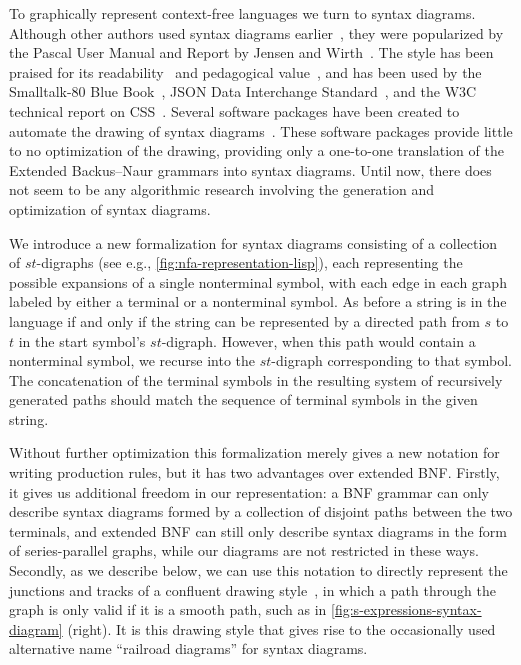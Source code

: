 \documentclass[10pt]{llncs}
\begin{document}
To graphically represent context-free languages we turn to syntax diagrams.
Although other authors used syntax diagrams earlier~\cite{cande-book}, they were popularized by the Pascal User Manual and Report by Jensen and Wirth~\cite{pascal-book}. The style has been praised for its readability~\cite{Bra-SJCD-1990} and pedagogical value~\cite{BelGil-Bull-1974}, and has been used by the Smalltalk-80 Blue Book~\cite{smalltalk-book}, JSON Data Interchange Standard~\cite{json-web}, and the W3C technical report on CSS~\cite{css-web}. Several software packages have been created to automate the drawing of syntax diagrams~\cite{sw1-web,sw2-web,sw3-web}. These software packages provide little to no optimization of the drawing, providing only a one-to-one translation of the Extended Backus--Naur grammars into syntax diagrams. Until now, there does not seem to be any algorithmic research involving the generation and optimization of syntax diagrams.

We introduce a new formalization for syntax diagrams consisting of a collection of $st$-digraphs (see e.g., \autoref{fig:nfa-representation-lisp}), each representing the possible expansions of a single nonterminal symbol, with each edge in each graph labeled by either a terminal or a nonterminal symbol. As before a string is in the language if and only if the string can be represented by a directed path from $s$ to $t$ in the start symbol's $st$-digraph. However, when this path would contain a nonterminal symbol, we recurse into the $st$-digraph corresponding to that symbol. The concatenation of the terminal symbols in the resulting system of recursively generated paths should match the sequence of terminal symbols in the given string.

Without further optimization this formalization merely gives a new notation for writing production rules, but it has two advantages over extended BNF. Firstly, it gives us additional freedom in our representation: a BNF grammar can only describe syntax diagrams formed by a collection of disjoint paths between the two terminals, and extended BNF can still only describe syntax diagrams in the form of series-parallel graphs, while our diagrams are not restricted in these ways. Secondly, as we describe below, we can use this notation to directly represent the junctions and tracks of a confluent drawing style~\cite{DicEppGooMen-GD-04}, in which a path through the graph is only valid if it is a smooth path, such as in \autoref{fig:s-expressions-syntax-diagram} (right). It is this drawing style that gives rise to the occasionally used alternative name ``railroad diagrams'' for syntax diagrams.
\end{document}
